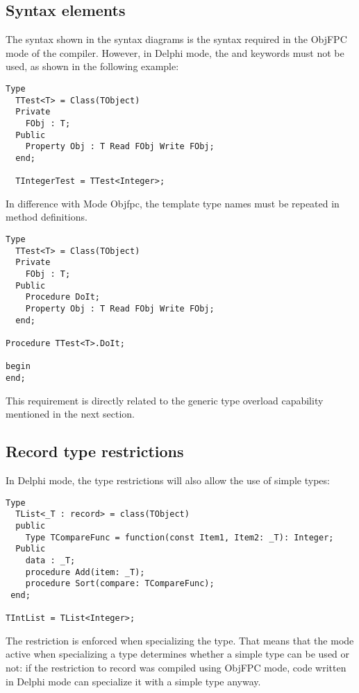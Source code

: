 \subsection{Syntax elements}
The syntax shown in the syntax diagrams is the syntax required in the ObjFPC mode of the compiler.
However, in Delphi mode, the  and  keywords must not be used, as shown in the following example:
\begin{verbatim}
Type
  TTest<T> = Class(TObject)
  Private
    FObj : T;
  Public
    Property Obj : T Read FObj Write FObj;
  end;

  TIntegerTest = TTest<Integer>;
\end{verbatim}
In difference with Mode Objfpc, the template type names must be repeated in method definitions.
\begin{verbatim}
Type
  TTest<T> = Class(TObject)
  Private
    FObj : T;
  Public
    Procedure DoIt;
    Property Obj : T Read FObj Write FObj;
  end;

Procedure TTest<T>.DoIt;

begin
end;
\end{verbatim}
This requirement is directly related to the generic type overload capability mentioned in the next section.

\subsection{Record type restrictions}
In Delphi mode, the  type restrictions will also allow the use of simple types:
\begin{verbatim}
Type
  TList<_T : record> = class(TObject)
  public
    Type TCompareFunc = function(const Item1, Item2: _T): Integer;
  Public
    data : _T;
    procedure Add(item: _T);
    procedure Sort(compare: TCompareFunc);
 end;

TIntList = TList<Integer>;
\end{verbatim}
The restriction is enforced when specializing the type. That means that the
mode active when specializing a type determines whether a simple type can be
used or not: if the restriction to record was compiled using ObjFPC mode,
code written in Delphi mode can specialize it with a simple type anyway.

